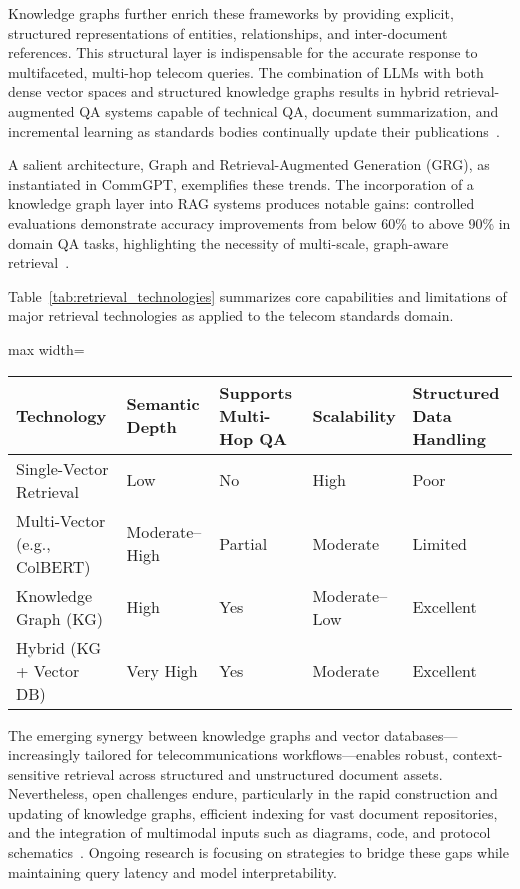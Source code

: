 Knowledge graphs further enrich these frameworks by providing explicit, structured representations of entities, relationships, and inter-document references. This structural layer is indispensable for the accurate response to multifaceted, multi-hop telecom queries. The combination of LLMs with both dense vector spaces and structured knowledge graphs results in hybrid retrieval-augmented QA systems capable of technical QA, document summarization, and incremental learning as standards bodies continually update their publications~\cite{ref16,ref20}.

A salient architecture, Graph and Retrieval-Augmented Generation (GRG), as instantiated in CommGPT, exemplifies these trends. The incorporation of a knowledge graph layer into RAG systems produces notable gains: controlled evaluations demonstrate accuracy improvements from below 60\% to above 90\% in domain QA tasks, highlighting the necessity of multi-scale, graph-aware retrieval~\cite{ref21}.

Table~\ref{tab:retrieval_technologies} summarizes core capabilities and limitations of major retrieval technologies as applied to the telecom standards domain.

\begin{table*}[htbp]
\centering
\caption{Characteristics of Retrieval and Indexing Technologies for Telecom Standards QA}
\label{tab:retrieval_technologies}
\begin{adjustbox}{max width=\textwidth}
\begin{tabular}{lllll}
\toprule
\textbf{Technology} & \textbf{Semantic Depth} & \textbf{Supports Multi-Hop QA} & \textbf{Scalability} & \textbf{Structured Data Handling} \\
\midrule
Single-Vector Retrieval & Low & No & High & Poor \\
Multi-Vector (e.g., ColBERT) & Moderate--High & Partial & Moderate & Limited \\
Knowledge Graph (KG) & High & Yes & Moderate--Low & Excellent \\
Hybrid (KG + Vector DB) & Very High & Yes & Moderate & Excellent \\
\bottomrule
\end{tabular}
\end{adjustbox}
\end{table*}

The emerging synergy between knowledge graphs and vector databases---increasingly tailored for telecommunications workflows---enables robust, context-sensitive retrieval across structured and unstructured document assets. Nevertheless, open challenges endure, particularly in the rapid construction and updating of knowledge graphs, efficient indexing for vast document repositories, and the integration of multimodal inputs such as diagrams, code, and protocol schematics~\cite{ref20,ref21,ref26}. Ongoing research is focusing on strategies to bridge these gaps while maintaining query latency and model interpretability.

